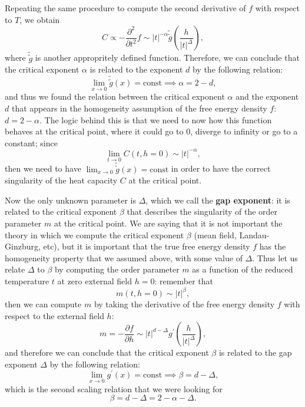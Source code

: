 Repeating the same procedure to compute the second derivative of \(f\) with respect to \(T\), we obtain
\[
    C \propto - \frac{\partial^2}{\partial t^2} f \sim \vert t \vert^{-\alpha} \tilde{\tilde{g}}\left(\frac{h}{\vert t \vert^{\Delta}}\right),
\]
where \(\tilde{\tilde{g}}\) is another appropritely defined function. Therefore, we can conclude that the critical exponent \(\alpha\) is related to the exponent \(d\) by the following relation:
\[
    \lim_{x \to 0} \tilde{\tilde{g}}(x) = \text{const} \implies \alpha = 2 - d,
\]
and thus we found the relation between the critical exponent \(\alpha\) and the exponent \(d\) that appears in the homogeneity assumption of the free energy density \(f\): \(d = 2 - \alpha\). The logic behind this is that we need to now how this function behaves at the critical point, where it could go to 0, diverge to infinity or go to a constant; since
\[
    \lim_{t \to 0} C (t, h=0) \sim \vert t \vert^{-\alpha},
\]
then we need to have \(\lim_{x \to 0} \tilde{\tilde{g}}(x) = \text{const}\) in order to have the correct singularity of the heat capacity \(C\) at the critical point.

Now the only unknown parameter is \(\Delta\), which we call the \textbf{gap exponent}: it is related to the critical exponent \(\beta\) that describes the singularity of the order parameter \(m\) at the critical point. We are saying that it is not important the theory in which we compute the critical exponent \(\beta\) (mean field, Landau-Ginzburg, etc), but it is important that the true free energy density \(f\) has the homogeneity property that we assumed above, with some value of \(\Delta\). Thus let us relate \(\Delta\) to \(\beta\) by computing the order parameter \(m\) as a function of the reduced temperature \(t\) at zero external field \(h=0\): remember that
\[
    m(t,h=0) \sim \vert t \vert^{\beta},
\]
then we can compute \(m\) by taking the derivative of the free energy density \(f\) with respect to the external field \(h\):
\[
    m = - \frac{\partial f}{\partial h} \sim \vert t \vert^{d-\Delta} g^{\prime} \left(\frac{h}{\vert t \vert^{\Delta}}\right),
\]
and therefore we can conclude that the critical exponent \(\beta\) is related to the gap exponent \(\Delta\) by the following relation:
\[
    \lim_{x \to 0} g^{\prime}(x) = \text{const} \implies \beta = d - \Delta,
\]
which is the second scaling relation that we were looking for
\[
    \beta = d - \Delta = 2 - \alpha - \Delta.
\]

